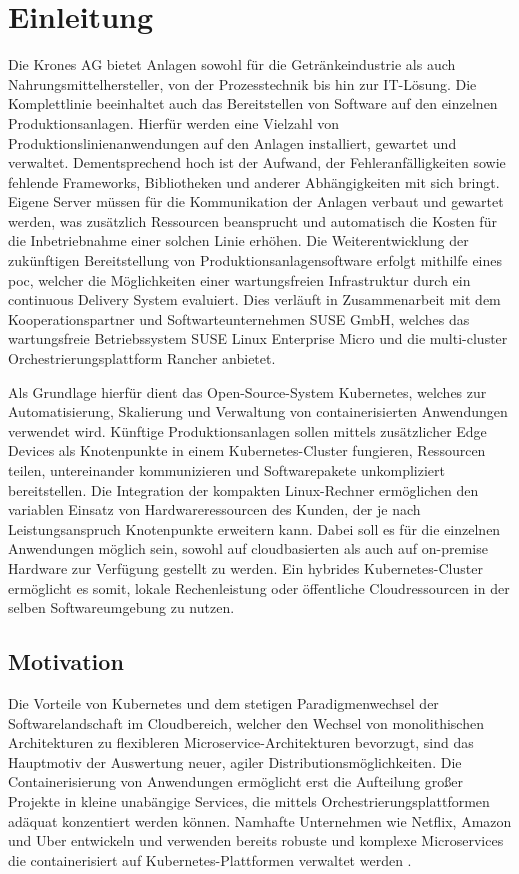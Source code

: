 \chapter{Einleitung}
Die Krones AG bietet Anlagen sowohl für die Getränkeindustrie als auch 
Nahrungsmittelhersteller, von der Prozesstechnik bis hin zur IT-Lösung. 
Die Komplettlinie beeinhaltet auch das Bereitstellen von Software auf den einzelnen Produktionsanlagen. 
Hierfür werden eine Vielzahl von Produktionslinienanwendungen auf den Anlagen installiert, gewartet
und verwaltet. Dementsprechend hoch ist der Aufwand, der Fehleranfälligkeiten sowie fehlende Frameworks, Bibliotheken
und anderer Abhängigkeiten mit sich bringt.
Eigene Server müssen für die Kommunikation der Anlagen verbaut und gewartet werden,
was zusätzlich Ressourcen beansprucht und automatisch die Kosten für die Inbetriebnahme einer solchen
Linie erhöhen. Die Weiterentwicklung der zukünftigen Bereitstellung von Produktionsanlagensoftware
erfolgt mithilfe eines \ac*{poc}, welcher die Möglichkeiten einer wartungsfreien Infrastruktur
durch ein continuous Delivery System evaluiert. Dies verläuft in Zusammenarbeit mit dem
Kooperationspartner und Softwarteunternehmen SUSE GmbH, welches das wartungsfreie Betriebssystem
SUSE Linux Enterprise Micro und die multi-cluster Orchestrierungsplattform Rancher anbietet.

Als Grundlage hierfür dient das Open-Source-System Kubernetes, welches zur Automatisierung, Skalierung
und Verwaltung von containerisierten Anwendungen verwendet wird. Künftige Produktionsanlagen sollen mittels zusätzlicher Edge Devices
als Knotenpunkte in einem Kubernetes-Cluster fungieren, Ressourcen teilen, untereinander kommunizieren und Softwarepakete unkompliziert bereitstellen.
Die Integration der kompakten Linux-Rechner ermöglichen den variablen Einsatz von Hardwareressourcen des Kunden, der je nach Leistungsanspruch Knotenpunkte erweitern kann.
Dabei soll es für die einzelnen Anwendungen möglich sein, sowohl auf cloudbasierten als auch auf on-premise Hardware zur Verfügung gestellt zu werden.
Ein hybrides Kubernetes-Cluster ermöglicht es somit, lokale Rechenleistung oder öffentliche Cloudressourcen in der selben Softwareumgebung zu nutzen.
\section{Motivation}
Die Vorteile von Kubernetes und dem stetigen Paradigmenwechsel der Softwarelandschaft im Cloudbereich, welcher
den Wechsel von monolithischen Architekturen zu flexibleren Microservice-Architekturen
bevorzugt, sind das Hauptmotiv der Auswertung neuer, agiler Distributionsmöglichkeiten.
Die Containerisierung von Anwendungen ermöglicht erst die Aufteilung großer Projekte
in kleine unabängige Services, die mittels Orchestrierungsplattformen adäquat konzentiert werden können.
Namhafte Unternehmen wie Netflix, Amazon und Uber entwickeln und verwenden
bereits robuste und komplexe Microservices die containerisiert auf Kubernetes-Plattformen
verwaltet werden \cite{microservice}. 

